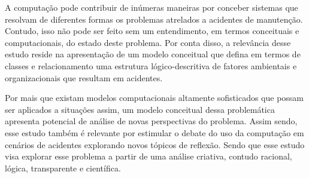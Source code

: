 A computação pode contribuir de inúmeras maneiras por conceber sistemas que resolvam de diferentes formas os problemas atrelados a acidentes de manutenção. Contudo, isso não pode ser feito sem um entendimento, em termos conceituais e computacionais, do estado deste problema. Por conta disso, a relevância desse estudo reside na apresentação de um modelo conceitual que defina em termos de classes e relacionamento uma estrutura lógico-descritiva de fatores ambientais e organizacionais que resultam em acidentes. 

Por mais que existam modelos computacionais altamente sofisticados que possam ser aplicados a situações assim, um modelo conceitual dessa problemática apresenta potencial de análise de novas perspectivas do problema. Assim sendo, esse estudo também é relevante por estimular o debate do uso da computação em cenários de acidentes explorando novos tópicos de reflexão. Sendo que esse estudo visa explorar esse problema a partir de uma análise criativa, contudo racional, lógica, transparente e científica. 